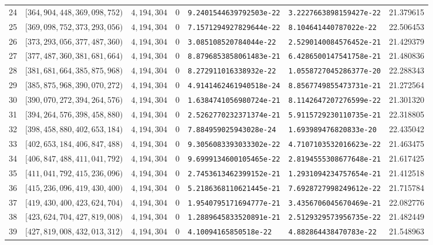 \documentclass[11pt]{article}
\newcommand{\1}{\mathbf 1}
\theoremstyle{plain}
\theoremstyle{definition}
\theoremstyle{remark}
\begin{document}
\begin{landscape}
\begin{longtable}{@{}r r r r l l r@{}}
24 & $[364,904,448,369,098,752)$ & $4,194,304$ & 0 & \texttt{9.2401544639792503e-22} & \texttt{3.2227663898159427e-22} & 21.379615\\
25 & $[369,098,752,373,293,056)$ & $4,194,304$ & 0 & \texttt{7.1571294927829644e-22} & \texttt{8.104641440787022e-22} & 22.506453\\
26 & $[373,293,056,377,487,360)$ & $4,194,304$ & 0 & \texttt{3.085108520784044e-22} & \texttt{2.5290140084576452e-21} & 21.429379\\
27 & $[377,487,360,381,681,664)$ & $4,194,304$ & 0 & \texttt{8.8796853858061483e-21} & \texttt{6.4286500147541758e-21} & 21.480836\\
28 & $[381,681,664,385,875,968)$ & $4,194,304$ & 0 & \texttt{8.272911016338932e-22} & \texttt{1.0558727045286377e-20} & 22.288343\\
29 & $[385,875,968,390,070,272)$ & $4,194,304$ & 0 & \texttt{4.9141462461940518e-24} & \texttt{8.8567749855473731e-21} & 21.272564\\
30 & $[390,070,272,394,264,576)$ & $4,194,304$ & 0 & \texttt{1.6384741056980724e-21} & \texttt{8.1142647207276599e-22} & 21.301320\\
31 & $[394,264,576,398,458,880)$ & $4,194,304$ & 0 & \texttt{2.5262770232371374e-21} & \texttt{5.9115729230110735e-21} & 22.318805\\
32 & $[398,458,880,402,653,184)$ & $4,194,304$ & 0 & \texttt{7.884959025943028e-24} & \texttt{1.693989476820833e-20} & 22.435042\\
33 & $[402,653,184,406,847,488)$ & $4,194,304$ & 0 & \texttt{9.3056083393033302e-22} & \texttt{4.7107103532016623e-22} & 21.463475\\
34 & $[406,847,488,411,041,792)$ & $4,194,304$ & 0 & \texttt{9.6999134600105465e-22} & \texttt{2.8194555308677648e-21} & 21.617425\\
35 & $[411,041,792,415,236,096)$ & $4,194,304$ & 0 & \texttt{2.7453613462399152e-21} & \texttt{1.2931094234757654e-21} & 21.412518\\
36 & $[415,236,096,419,430,400)$ & $4,194,304$ & 0 & \texttt{5.2186368110621445e-21} & \texttt{7.6928727998249612e-22} & 21.715784\\
37 & $[419,430,400,423,624,704)$ & $4,194,304$ & 0 & \texttt{1.9540795171694777e-21} & \texttt{3.4356706045670469e-21} & 22.082776\\
38 & $[423,624,704,427,819,008)$ & $4,194,304$ & 0 & \texttt{1.2889645833520891e-21} & \texttt{2.5129329573956735e-22} & 21.482449\\
39 & $[427,819,008,432,013,312)$ & $4,194,304$ & 0 & \texttt{4.10094165850518e-22} & \texttt{4.882864438470783e-22} & 21.548963\\

\end{longtable}
\end{landscape}
\end{document}
